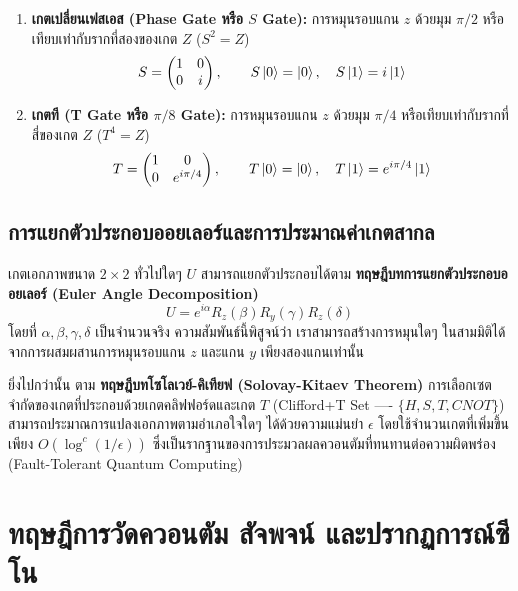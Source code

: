 \begin{enumerate}
    \item \textbf{เกตเปลี่ยนเฟสเอส (Phase Gate หรือ $S$ Gate):} การหมุนรอบแกน $z$ ด้วยมุม $\pi/2$ หรือเทียบเท่ากับรากที่สองของเกต $Z$ ($S^2 = Z$)
    \begin{equation}
    S = \begin{pmatrix} 1 & 0 \\ 0 & i \end{pmatrix}, \qquad S\ket{0} = \ket{0}, \quad S\ket{1} = i\ket{1}
    \end{equation}
    \item \textbf{เกตที (T Gate หรือ $\pi/8$ Gate):} การหมุนรอบแกน $z$ ด้วยมุม $\pi/4$ หรือเทียบเท่ากับรากที่สี่ของเกต $Z$ ($T^4 = Z$)
    \begin{equation}
    T = \begin{pmatrix} 1 & 0 \\ 0 & e^{i\pi/4} \end{pmatrix}, \qquad T\ket{0} = \ket{0}, \quad T\ket{1} = e^{i\pi/4}\ket{1}
    \end{equation}
\end{enumerate}

\subsection{การแยกตัวประกอบออยเลอร์และการประมาณค่าเกตสากล}
เกตเอกภาพขนาด $2 \times 2$ ทั่วไปใดๆ $U$ สามารถแยกตัวประกอบได้ตาม \textbf{ทฤษฎีบทการแยกตัวประกอบออยเลอร์ (Euler Angle Decomposition)}
\begin{equation}
U = e^{i\alpha} R_z(\beta) R_y(\gamma) R_z(\delta)
\label{eq:euler_decomposition}
\end{equation}
โดยที่ $\alpha, \beta, \gamma, \delta$ เป็นจำนวนจริง ความสัมพันธ์นี้พิสูจน์ว่า เราสามารถสร้างการหมุนใดๆ ในสามมิติได้จากการผสมผสานการหมุนรอบแกน $z$ และแกน $y$ เพียงสองแกนเท่านั้น

ยิ่งไปกว่านั้น ตาม \textbf{ทฤษฎีบทโซโลเวย์-คิเทียฟ (Solovay-Kitaev Theorem)} การเลือกเซตจำกัดของเกตที่ประกอบด้วยเกตคลิฟฟอร์ดและเกต $T$ (Clifford+T Set ---- $\{H, S, T, CNOT\}$) สามารถประมาณการแปลงเอกภาพตามอำเภอใจใดๆ ได้ด้วยความแม่นยำ $\epsilon$ โดยใช้จำนวนเกตที่เพิ่มขึ้นเพียง $O(\log^c(1/\epsilon))$ ซึ่งเป็นรากฐานของการประมวลผลควอนตัมที่ทนทานต่อความผิดพร่อง (Fault-Tolerant Quantum Computing)

\section{ทฤษฎีการวัดควอนตัม สัจพจน์ และปรากฏการณ์ซีโน}

